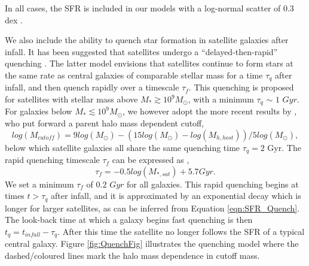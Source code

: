 In all cases, the SFR is included in our models with a log-normal scatter of 0.3 dex \citep{Leja2015ReconcilingFunction}.


We also include the ability to quench star formation in satellite galaxies after infall. It has been suggested that satellites undergo a ``delayed-then-rapid'' quenching \citep{Wetzel2013GalaxyUniverse}. The latter model envisions that satellites continue to form stars at the same rate as central galaxies of comparable stellar mass for a time $\tau_q$ after infall, and then quench rapidly over a timescale $\tau_{f}$. This quenching is proposed for satellites with stellar mass above $M_*\gtrsim 10^9 M_{\odot}$, with a minimum $\tau_q$ $\sim$ $1$ $Gyr$. For galaxies below $M_* \lesssim 10^{9} M_{\odot}$, we however adopt the more recent results by \citet{Fillingham2016UnderStripping}, who put forward a parent halo mass dependent cutoff,
\begin{equation}
\label{eqn:Cutoff}
log(M_{cutoff}) = 9 log(M_{\odot}) - (15 log(M_{\odot}) - log(M_{h,host}))/5log(M_{\odot}) ,
\end{equation}
below which satellite galaxies all share the same quenching time $\tau_q=2$ Gyr.
The rapid quenching timescale $\tau_{f}$ can be expressed as \citep{Wetzel2013GalaxyUniverse},
\begin{equation}
\label{eqn:tauf}
\tau_f = -0.5 log(M_{*,sat}) + 5.7 Gyr.
\end{equation}
We set a minimum $\tau_{f}$ of $0.2$ $Gyr$ for all galaxies. This rapid quenching begins at times $t > \tau_q$ after infall, and it is approximated by an exponential decay which is longer for larger satellites, as can be inferred from Equation \ref{eqn:SFR_Quench}. The look-back time at which a galaxy begins fast quenching is then $t_q = t_{infall} - \tau_q$. After this time the satellite no longer follows the SFR of a typical central galaxy. Figure \ref{fig:QuenchFig} illustrates the quenching model where the dashed/coloured lines mark the halo mass dependence in cutoff mass.

